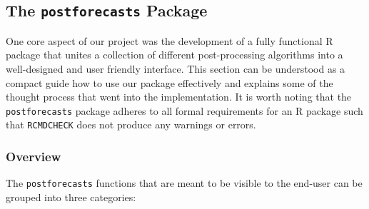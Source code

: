 \documentclass[
]{article}
\begin{document}
\hypertarget{package}{%
\subsection{\texorpdfstring{The \texttt{postforecasts} Package}{The postforecasts Package}}\label{package}}

One core aspect of our project was the development of a fully functional R package that unites a collection of different post-processing algorithms into a well-designed and user friendly interface.
This section can be understood as a compact guide how to use our package effectively and explains some of the thought process that went into the implementation.
It is worth noting that the \texttt{postforecasts} package adheres to all formal requirements for an R package such that \texttt{RCMDCHECK} does not produce any warnings or errors.

\hypertarget{overview}{%
\subsubsection{Overview}\label{overview}}

The \texttt{postforecasts} functions that are meant to be visible to the end-user can be grouped into three categories:
\end{document}
